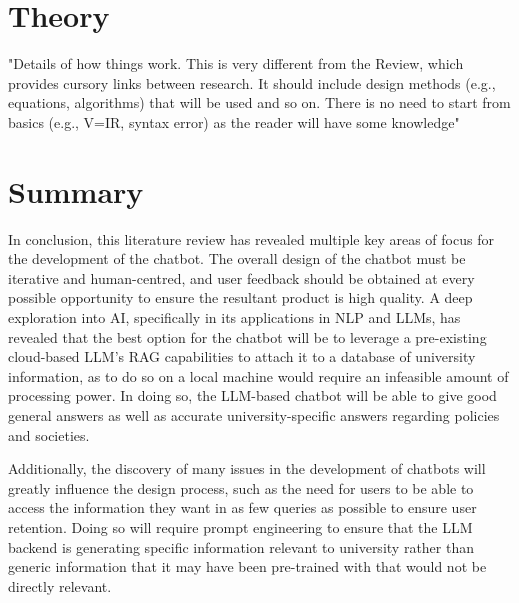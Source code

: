 \documentclass[12pt]{report}
\begin{document}
    \section{Theory}

    "Details of how things work. This is very different from the Review, which provides 
    cursory links between research. It should include design methods (e.g., equations, algorithms) 
    that will be used and so on. There is no need to start from basics (e.g., V=IR, syntax error) 
    as the reader will have some knowledge"

    
    \section{Summary}

    
    In conclusion, this literature review has revealed multiple key areas of focus for the development of the 
    chatbot. The overall design of the chatbot must be iterative and human-centred, and user feedback should 
    be obtained at every possible opportunity to ensure the resultant product is high quality. A deep exploration 
    into AI, specifically in its applications in NLP and LLMs, has revealed that the best option for the chatbot 
    will be to leverage a pre-existing cloud-based LLM's RAG capabilities to attach it to a database of 
    university information, as to do so on a local machine would require an infeasible amount of processing power.
    In doing so, the LLM-based chatbot will be able to give good general answers as well as accurate 
    university-specific answers regarding policies and societies.

    Additionally, the discovery of many issues in the development of chatbots will greatly influence the design 
    process, such as the need for users to be able to access the information they want in as few queries as 
    possible to ensure user retention. Doing so will require prompt engineering to ensure that the LLM backend 
    is generating specific information relevant to university rather than generic information that it may 
    have been pre-trained with that would not be directly relevant.
\end{document}
